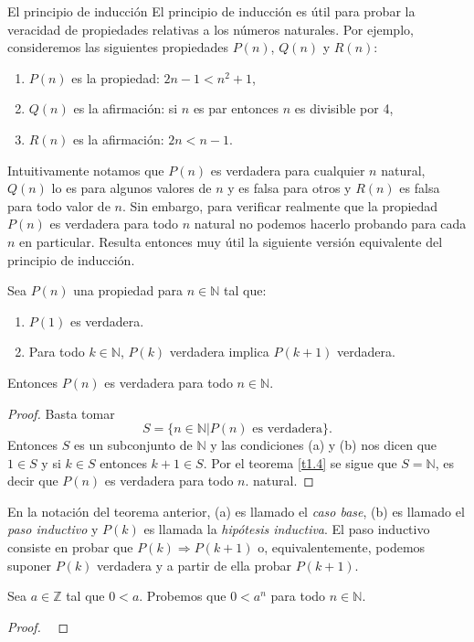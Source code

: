 \begin{section}{El principio de inducción}
El principio de inducción es útil para probar la veracidad de propiedades relativas a los números naturales. Por ejemplo, consideremos las siguientes propiedades $P(n)$, $Q(n)$ y $R(n)$:
\begin{enumerate}[label=(\alph*)]
\item $P(n)$ es la propiedad: $2n -1 < n^2 + 1$,
\item $Q(n)$ es la afirmación: si $n$ es par entonces $n$ es divisible por 4,
\item $R(n)$ es la afirmación: $2n < n- 1$.
\end{enumerate}
Intuitivamente notamos que $P(n)$ es verdadera para cualquier $n$ natural, $Q(n)$ lo es para algunos valores de $n$ y es falsa para otros y $R(n)$ es falsa para todo valor de $n$. Sin embargo, para verificar realmente que la propiedad $P(n)$ es verdadera para todo $n$ natural no podemos hacerlo probando para cada $n$ en particular. Resulta entonces muy útil la siguiente versión equivalente del principio de inducción.
\begin{teorema}\label{induccion2} Sea $P(n)$ una propiedad para $n \in \mathbb N$ tal que:
\begin{enumerate}[label=(\alph*)]
\item $P(1)$ es verdadera.
\item Para todo $k \in \mathbb N$, $P(k)$ verdadera implica $P(k + 1)$ verdadera.
\end{enumerate}
Entonces $P(n)$ es verdadera para todo $n \in \mathbb N$.
\end{teorema}
\begin{proof} Basta tomar
$$S = \{n \in \mathbb N| P(n) \text{ es verdadera} \}.$$
Entonces $S$ es un subconjunto de $\mathbb N$ y las condiciones (a) y (b) nos dicen que $1 \in S$ y  si $ k \in S$ entonces $k+1\in S$. Por el teorema \ref{t1.4} se sigue que $S= \mathbb N$, es decir que $P(n)$ es verdadera para todo $n$.
natural.
\end{proof}


En la notación del teorema anterior, (a) es llamado  el {\em caso base}, (b) es llamado el  {\em paso inductivo} y $P(k)$ es llamada la {\em hipótesis inductiva}. El paso inductivo  consiste en probar que $P(k) \Rightarrow P(k + 1)$ o, equivalentemente, podemos suponer $P(k)$ verdadera y a partir de ella probar $P(k + 1)$. 


\begin{ejemplo}\label{ejemplo141} Sea $a\in \mathbb Z$ tal que $0<a$. Probemos que $0<a^n$ para todo $n \in \mathbb N$.
\end{ejemplo}
\begin{proof}
\


\end{proof}
\end{section}

